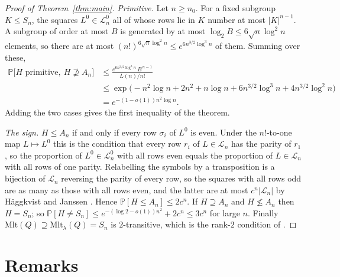 \documentclass[11pt]{amsart}
\theoremstyle{plain}
\theoremstyle{remark}
\newcommand{\Mlt}{\mathrm{Mlt}}
\renewcommand{\Pr}{\mathbb{P}}
\newcommand{\LL}{\mathcal{L}}
\begin{document}
\begin{proof}[Proof of Theorem~\ref{thm:main}]
\emph{Primitive.}  Let $n\ge n_0$.  For a fixed subgroup $K\le S_n$,
the squares $L^0\in\LL_n^0$ all of whose rows lie in $K$ number at most
$|K|^{n-1}$.  A subgroup of order at most $B$ is generated by at most
$\log_2B\le6\sqrt n\log^2n$ elements, so there are at most
$(n!)^{6\sqrt n\log^2n}\le e^{6n^{3/2}\log^3n}$ of them.  Summing over
these,
\begin{align*}
\Pr\bigl[H\text{ primitive},\ H\not\supseteq A_n\bigr]
&\le\frac{e^{6n^{3/2}\log^3n}\,B^{\,n-1}}{L(n)/n!}\\
&\le\exp\bigl(-n^2\log n+2n^2+n\log n+6n^{3/2}\log^3n+4n^{3/2}\log^2n\bigr)\\
&=e^{-(1-o(1))n^2\log n}.
\end{align*}
Adding the two cases gives the first inequality of the theorem.

\emph{The sign.}  $H\le A_n$ if and only if every row $\sigma_i$ of
$L^0$ is even.  Under the $n!$-to-one map $L\mapsto L^0$ this is the
condition that every row $r_i$ of $L\in\LL_n$ has the parity of $r_1$,
so the proportion of $L^0\in\LL_n^0$ with all rows even equals the
proportion of $L\in\LL_n$ with all rows of one parity.  Relabelling the
symbols by a transposition is a bijection of $\LL_n$ reversing the
parity of every row, so the squares with all rows odd are as many as
those with all rows even, and the latter are at most $c^n|\LL_n|$ by
H\"aggkvist and Janssen \cite{HJ96}.  Hence $\Pr[H\le A_n]\le2c^n$.  If $H\supseteq A_n$ and
$H\not\le A_n$ then $H=S_n$; so $\Pr[H\ne S_n]\le e^{-(\log2-o(1))n^2}+2c^n\le3c^n$
for large $n$.  Finally $\Mlt(Q)\supseteq\Mlt_\lambda(Q)=S_n$ is
$2$-transitive, which is the rank-$2$ condition of \cite{Smith}.
\end{proof}

\section{Remarks}
\end{document}
